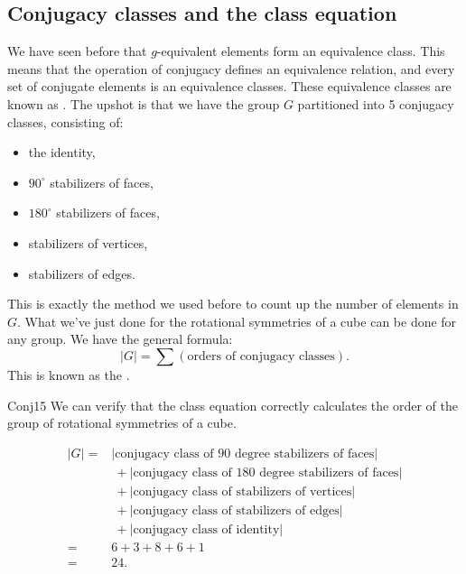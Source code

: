 
\subsection{Conjugacy classes and the class equation}
\label{subsec:GroupActions:Conjugation:ConjugacyClass}

We have seen before that $g$-equivalent elements form an equivalence class. This means that the operation of conjugacy defines an equivalence relation, and every set of conjugate elements is an equivalence classes. These equivalence classes are known as .
The upshot is that we have the group $G$ partitioned into 5 conjugacy classes, consisting of: 
\begin{itemize}
\item
the identity, 
\item
 $90^{\circ}$ stabilizers of faces, 
\item
$180^{\circ}$ stabilizers of faces, 
\item
stabilizers of vertices, 
\item
stabilizers of edges. 
\end{itemize}

This is exactly the method we used before to count up the number of elements in $G$.  
What we've just done for the rotational symmetries of a cube can be done for any group.  We have the general formula:
$$|G| = \sum (\text{orders of conjugacy classes}).$$
This is known as the .

\begin{example}{Conj15}
  We can verify that the class equation correctly calculates the order of the group of rotational symmetries of a cube. 

\begin{align*}
|G|=&|\text{conjugacy class of 90 degree stabilizers of faces}| \\
&~+|\text{conjugacy class of 180 degree stabilizers of faces}|\\
&~+|\text{conjugacy class of stabilizers of vertices}|\\
&~+|\text{conjugacy class of stabilizers of edges}|\\
&~+|\text{conjugacy class of identity}|\\
=&6+3+8+6+1\\
=&24.
\end{align*}
\end{example}

